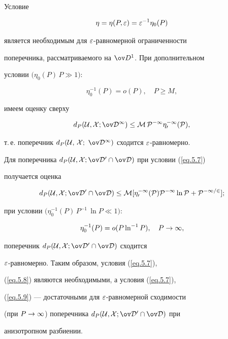 \begin{notes} \label{r5.1.3}


Условие


\begin{equation}\label{eq.5.7}


\eta=\eta(P,\eps)=\eps^{-1}\eta_0(P)


\end{equation}


является необходимым для $\varepsilon$-равномерной ограниченности


поперечника, рассматриваемого на $\od{}^1$. При дополнительном


условии $\big(\eta_0(P)\,P \gg 1\big)$:


\begin{equation}\label{eq.5.8}


\eta_0^{-1}(P)=o(P), \quad P \geq M,


\end{equation}


имеем оценку сверху


$$


d_P(\cu,X;\od{}^1)\leq M\,P^{-1}\eta_0^{-1}(P),


$$


т.\,е. поперечник $d_P(\cu,\,X;\ \od{}^1)$ сходится $\varepsilon$-равномерно.


Для поперечника $d_P(\cu,X;\od{}^0\cap\od)$ при условии (\ref{eq.5.7})


получается оценка


$$


d_P(\cu,X;\od{}^0\cap\od)\leq M[\eta_0^{-1}(P)P^{-1}\ln P+P^{-1/2}];


$$


при условии $\big(\eta_0^{-1}(P)\,P^{-1}\,\ln P \ll 1\big)$:


\begin{equation}\label{eq.5.9}


\eta_0^{-1}(P)=o(P\ln^{-1}P), \quad P \ra \infty,


\end{equation}


поперечник $d_P(\cu,X;\od{}^0\cap\od)$ сходится


$\varepsilon$-равномерно. Таким образом, условия (\ref{eq.5.7}),


(\ref{eq.5.8}) являются необходимыми, а условия (\ref{eq.5.7}),


(\ref{eq.5.9}) --- достаточными для $\varepsilon$-равномерной сходимости


(при $P\rightarrow\infty$) поперечника $d_P(\cu,X;\od{}^0\cap\od)$ при


анизотропном разбиении.


\end{notes}





